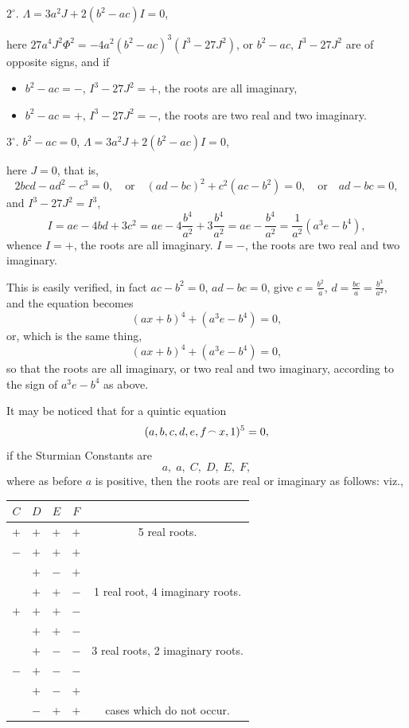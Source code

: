 \documentclass[11pt,a4paper]{book}
\begin{document}
$2^\circ$. $\Lambda = 3a^2J + 2(b^2 - ac)I = 0$,

here $27a^4J^2\Phi^2 = -4a^2(b^2 - ac)^3(I^3 - 27J^2)$, or $b^2 - ac$, $I^3 - 27J^2$ are of opposite signs, and if
\begin{itemize}
    \item $b^2 - ac = -$, $I^3 - 27J^2 = +$, the roots are all imaginary,
    \item $b^2 - ac = +$, $I^3 - 27J^2 = -$, the roots are two real and two imaginary.
\end{itemize}

$3^\circ$. $b^2 - ac = 0$, $\Lambda = 3a^2J + 2(b^2 - ac)I = 0$,

here $J = 0$, that is,
\[
2bcd - ad^2 - c^3 = 0,\quad \text{or}\quad (ad - bc)^2 + c^2(ac - b^2) = 0,\quad \text{or}\quad ad - bc = 0,
\]
and $I^3 - 27J^2 = I^3$,
\[
I = ae - 4bd + 3c^2 = ae - 4\frac{b^4}{a^2} + 3\frac{b^4}{a^2} = ae - \frac{b^4}{a^2} = \frac{1}{a^2}(a^3e - b^4),
\]
whence $I = +$, the roots are all imaginary. $I = -$, the roots are two real and two imaginary.

This is easily verified, in fact $ac - b^2 = 0$, $ad - bc = 0$, give $c = \frac{b^2}{a}$, $d = \frac{bc}{a} = \frac{b^3}{a^2}$, and the equation becomes
\[
(ax + b)^4 + (a^3e - b^4) = 0,
\]
or, which is the same thing,
\[
(ax + b)^4 + (a^3e - b^4) = 0,
\]
so that the roots are all imaginary, or two real and two imaginary, according to the sign of $a^3e - b^4$ as above.

It may be noticed that for a quintic equation
\[
(a, b, c, d, e, f \mathbin{\vcenter{\hbox{$\scriptstyle\!\frown$}}} x, 1)^5 = 0,
\]
if the Sturmian Constants are
\[
a,\; a,\; C,\; D,\; E,\; F,
\]
where as before $a$ is positive, then the roots are real or imaginary as follows: viz.,
\begin{center}
\begin{tabular}{cccc|c}
$C$ & $D$ & $E$ & $F$ & \\\hline
$+$ & $+$ & $+$ & $+$ & 5 real roots.\\
$-$ & $+$ & $+$ & $+$ & \\[-4pt]
  & $+$ & $-$ & $+$ & \\[-4pt]
  & $+$ & $+$ & $-$ & 1 real root, 4 imaginary roots.\\
$+$ & $+$ & $+$ & $-$ & \\[-4pt]
  & $+$ & $+$ & $-$ & \\[-4pt]
  & $+$ & $-$ & $-$ & 3 real roots, 2 imaginary roots.\\
$-$ & $+$ & $-$ & $-$ & \\[-4pt]
  & $+$ & $-$ & $+$ & \\[-4pt]
  & $-$ & $+$ & $+$ & cases which do not occur.
\end{tabular}
\end{center}
\end{document}
